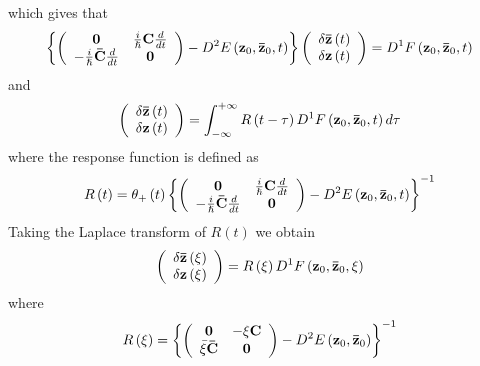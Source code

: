 \documentclass[aps,preprint]{revtex4}%
\begin{document}
which gives that
\begin{equation}
\left\{  \left(
\begin{array}
[c]{cc}%
\mathbf{0} & \frac{i}{\hslash}\mathbf{C}\frac{d}{dt}\\
-\frac{i}{\hslash}\mathbf{\bar{C}}\frac{d}{dt} & \mathbf{0}%
\end{array}
\right)  -D^{2}E\left(  \mathbf{z}_{0},\mathbf{\bar{z}}_{0},t\right)
\right\}  \left(
\begin{array}
[c]{c}%
\delta\mathbf{\bar{z}}\left(  t\right) \\
\delta\mathbf{z}\left(  t\right)
\end{array}
\right)  =D^{1}F\left(  \mathbf{z}_{0},\mathbf{\bar{z}}_{0},t\right)
\end{equation}
and
\begin{equation}
\left(
\begin{array}
[c]{c}%
\delta\mathbf{\bar{z}}\left(  t\right) \\
\delta\mathbf{z}\left(  t\right)
\end{array}
\right)  =\int_{-\infty}^{+\infty}R\left(  t-\tau\right)  D^{1}F\left(
\mathbf{z}_{0},\mathbf{\bar{z}}_{0},t\right)  d\tau
\end{equation}
where the response function is defined as
\begin{equation}
R\left(  t\right)  =\theta_{+}\left(  t\right)  \left\{  \left(
\begin{array}
[c]{cc}%
\mathbf{0} & \frac{i}{\hslash}\mathbf{C}\frac{d}{dt}\\
-\frac{i}{\hslash}\mathbf{\bar{C}}\frac{d}{dt} & \mathbf{0}%
\end{array}
\right)  -D^{2}E\left(  \mathbf{z}_{0},\mathbf{\bar{z}}_{0},t\right)
\right\}  ^{-1}%
\end{equation}
Taking the Laplace transform of $R\left(  t\right)  $ we obtain
\begin{equation}
\left(
\begin{array}
[c]{c}%
\delta\mathbf{\bar{z}}\left(  \xi\right) \\
\delta\mathbf{z}\left(  \xi\right)
\end{array}
\right)  =R\left(  \xi\right)  D^{1}F\left(  \mathbf{z}_{0},\mathbf{\bar{z}%
}_{0},\xi\right)
\end{equation}
where
\begin{equation}
R\left(  \xi\right)  =\left\{  \left(
\begin{array}
[c]{cc}%
\mathbf{0} & -\xi\mathbf{C}\\
\bar{\xi}\mathbf{\bar{C}} & \mathbf{0}%
\end{array}
\right)  -D^{2}E\left(  \mathbf{z}_{0},\mathbf{\bar{z}}_{0}\right)  \right\}
^{-1}%
\end{equation}
\end{document}
